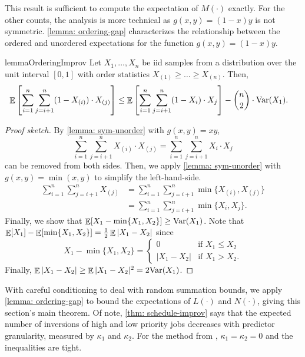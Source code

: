 This result is sufficient to compute the expectation of $M(\cdot)$ exactly. For the other counts, the analysis is more technical as $g(x,y)=(1-x)y$ is not symmetric. \cref{lemma: ordering-gap} characterizes the relationship between the ordered and unordered expectations for the function $g(x,y)=(1-x)y$.
\begin{restatable}{lemma}{OrderingImprov}\label{lemma: ordering-gap}
    Let $X_1, \dots, X_n$ be iid samples from a distribution over the unit interval $[0,1]$ with order statistics $X_{(1)} \geq \dots \geq X_{(n)}$. Then,
    \begin{align*}
    \mathop{\mathbb{E}}\left[\sum_{i=1}^n \sum_{j = i+1}^n (1-X_{(i)}) \cdot X_{(j)}\right] \leq \mathop{\mathbb{E}}\left[\sum_{i=1}^n \sum_{j = i+1}^n (1-X_{i}) \cdot X_{j}\right]  &-  \binom{n}{2} \cdot \mathrm{Var}(X_1).
    \end{align*}
\end{restatable}
\begin{proof}[Proof sketch]
    By \cref{lemma: sym-unorder} with $g(x,y)=xy$,
    \[\sum_{i=1}^n \sum_{j = i+1}^n X_{(i)} \cdot X_{(j)} = \sum_{i=1}^n \sum_{j = i+1}^n X_{i} \cdot X_{j}\] can be removed from both sides. Then, we apply \cref{lemma: sym-unorder} with $g(x,y)=\min(x,y)$ to simplify the left-hand-side.
    \begin{align*}
        \sum_{i=1}^n \sum_{j=i+1}^n X_{(j)} &= \sum_{i=1}^n \sum_{j=i+1}^n \min\{X_{(i)}, X_{(j)}\} \\
        &= \sum_{i=1}^n \sum_{j=i+1}^n \min\{X_i, X_j\}.
    \end{align*}
    Finally, we show that $\mathop{\mathbb{E}}[X_1 - \min\{X_1, X_2\}] \geq \mathrm{Var}(X_1)$. Note that $\mathop{\mathbb{E}}[X_1] - \mathop{\mathbb{E}}[\min\{X_1, X_2\}] = \frac{1}{2} \mathop{\mathbb{E}} |X_1-X_2|$ since
    \[X_1 - \min\{X_1, X_2\} = \begin{cases} 
    0 &\text{if $X_1 \leq X_2$}\\
    |X_1-X_2| &\text{if $X_1 > X_2$}.\end{cases}\]
    Finally, $\mathop{\mathbb{E}}|X_1-X_2| \geq \mathop{\mathbb{E}}|X_1 - X_2|^2 = 2\mathrm{Var}(X_1)$.
\end{proof}
With careful conditioning to deal with random summation bounds, we apply \cref{lemma: ordering-gap} to bound the expectations of $L(\cdot)$ and $N(\cdot)$, giving this section's main theorem. Of note, \cref{thm: schedule-improv} says that the expected number of inversions of high and low priority jobs decreases with predictor granularity, measured by $\kappa_1$ and $\kappa_2$. For the method from \citet{Cho22:Scheduling}, $\kappa_1=\kappa_2=0$ and the inequalities are tight.
